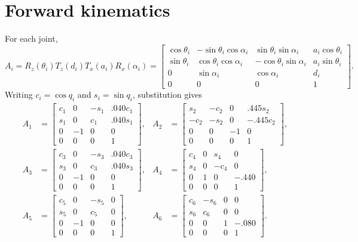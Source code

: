 \documentclass[10pt,a4paper]{article}
\begin{document}
\section{Forward kinematics}
For each joint,
\begin{equation}
A_i=R_z(\theta_i)T_z(d_i)T_x(a_i)R_x(\alpha_i)
=\begin{bmatrix}
\cos\theta_i&-\sin\theta_i\cos\alpha_i&\sin\theta_i\sin\alpha_i&a_i\cos\theta_i\\
\sin\theta_i&\cos\theta_i\cos\alpha_i&-\cos\theta_i\sin\alpha_i&a_i\sin\theta_i\\
0&\sin\alpha_i&\cos\alpha_i&d_i\\0&0&0&1
\end{bmatrix}.
\end{equation}
Writing $c_i=\cos q_i$ and $s_i=\sin q_i$, substitution gives
\begin{align*}
A_1&=\begin{bmatrix}c_1&0&-s_1&.040c_1\\s_1&0&c_1&.040s_1\\0&-1&0&0\\0&0&0&1\end{bmatrix},&
A_2&=\begin{bmatrix}s_2&-c_2&0&.445s_2\\-c_2&-s_2&0&-.445c_2\\0&0&-1&0\\0&0&0&1\end{bmatrix},\\[3pt]
A_3&=\begin{bmatrix}c_3&0&-s_3&.040c_3\\s_3&0&c_3&.040s_3\\0&-1&0&0\\0&0&0&1\end{bmatrix},&
A_4&=\begin{bmatrix}c_4&0&s_4&0\\s_4&0&-c_4&0\\0&1&0&-.440\\0&0&0&1\end{bmatrix},\\[3pt]
A_5&=\begin{bmatrix}c_5&0&-s_5&0\\s_5&0&c_5&0\\0&-1&0&0\\0&0&0&1\end{bmatrix},&
A_6&=\begin{bmatrix}c_6&-s_6&0&0\\s_6&c_6&0&0\\0&0&1&-.080\\0&0&0&1\end{bmatrix}.
\end{align*}
\end{document}
